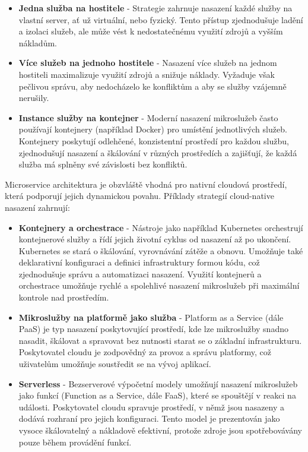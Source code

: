 \begin{itemize}
    \item \textbf{Jedna služba na hostitele} - Strategie zahrnuje nasazení každé služby na vlastní server, ať už virtuální, nebo fyzický. Tento přístup zjednodušuje ladění a izolaci služeb, ale může vést k nedostatečnému využití zdrojů a vyšším nákladům.
    \item \textbf{Více služeb na jednoho hostitele} - Nasazení více služeb na jednom hostiteli maximalizuje využití zdrojů a snižuje náklady. Vyžaduje však pečlivou správu, aby nedocházelo ke konfliktům a aby se služby vzájemně nerušily.
    \item \textbf{Instance služby na kontejner} - Moderní nasazení mikroslužeb často používají kontejnery (například Docker) pro umístění jednotlivých služeb. Kontejnery poskytují odlehčené, konzistentní prostředí pro každou službu, zjednodušují nasazení a škálování v různých prostředích a zajišťují, že každá služba má splněny své závislosti bez konfliktů.
\end{itemize}


Microservice architektura je obzvláště vhodná pro nativní cloudová prostředí, která podporují jejich dynamickou povahu. Příklady strategií cloud-native nasazení zahrnují:

\begin{itemize}
    \item \textbf{Kontejnery a orchestrace} - Nástroje jako například Kubernetes orchestrují kontejnerové služby a řídí jejich životní cyklus od nasazení až po ukončení. Kubernetes se stará o škálování, vyrovnávání zátěže a obnovu. Umožňuje také deklarativní konfiguraci a  definici infrastruktury formou kódu, což zjednodušuje správu a automatizaci nasazení. Využití kontejnerů a orchestrace umožňuje rychlé a spolehlivé nasazení mikroslužeb při maximální kontrole nad prostředím.
    \item \textbf{Mikroslužby na platformě jako služba} - Platform as a Service (dále PaaS) je typ nasazení poskytovující prostředí, kde lze mikroslužby snadno nasadit, škálovat a spravovat bez nutnosti starat se o základní infrastrukturu. Poskytovatel cloudu je zodpovědný za provoz a správu platformy, což uživatelům umožňuje soustředit se na vývoj aplikací.
    \item \textbf{Serverless} - Bezserverové výpočetní modely umožňují nasazení mikroslužeb jako funkcí (Function as a Service, dále FaaS), které se spouštějí v reakci na události. Poskytovatel cloudu spravuje prostředí, v němž jsou nasazeny a dodává rozhraní pro jejich konfiguraci. Tento model je prezentován jako vysoce škálovatelný a nákladově efektivní, protože zdroje jsou spotřebovávány pouze během provádění funkcí.
\end{itemize}

